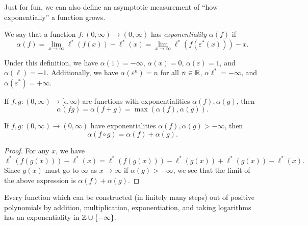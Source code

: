 \documentclass[letterpaper,11pt]{article}
\begin{document}
Just for fun, we can also define an asymptotic measurement of ``how exponentially'' a function grows.

\begin{defn} We say that a function $f:(0,\infty) \rightarrow (0,\infty)$ has \emph{exponentiality} $\alpha(f)$ if
\[
\alpha(f) = \lim_{x\rightarrow \infty} \ell^*(f(x)) - \ell^*(x) = \lim_{x \rightarrow \infty} \ell^*(f(\varepsilon^*(x))) - x.
\]
\end{defn}

Under this definition, we have $\alpha(1) = -\infty$, $\alpha(x) = 0$, $\alpha(\varepsilon) = 1$, and $\alpha(\ell) = -1$. Additionally, we have $\alpha(\varepsilon^n) = n$ for all $n \in \mathbb{R}$, $\alpha{\ell^*} = -\infty$, and $\alpha(\varepsilon^*) = +\infty$.

\begin{prop} If $f,g : (0,\infty) \rightarrow [\epsilon,\infty)$ are functions with exponentialities $\alpha(f), \alpha(g)$, then
\[
\alpha(fg) = \alpha(f+g) = \max(\alpha(f),\alpha(g)).
\]
\end{prop}

\begin{prop} If $f,g : (0,\infty) \rightarrow (0,\infty)$ have exponentialities $\alpha(f), \alpha(g) > -\infty$, then
\[
\alpha(f \circ g) = \alpha(f) + \alpha(g).
\]
\end{prop}
\begin{proof} For any $x$, we have
\[
\ell^*(f(g(x))) - \ell^*(x) = \ell^*(f(g(x))) - \ell^*(g(x)) + \ell^*(g(x)) - \ell^*(x).
\]
Since $g(x)$ must go to $\infty$ as $x \rightarrow \infty$ if $\alpha(g) > -\infty$, we see that the limit of the above expression is $\alpha(f) + \alpha(g)$.
\end{proof}

\begin{cor} Every function which can be constructed (in finitely many steps) out of positive polynomials by addition, multiplication, exponentiation, and taking logarithms has an exponentiality in $\mathbb{Z} \cup \{-\infty\}$.
\end{cor}



\end{document}
